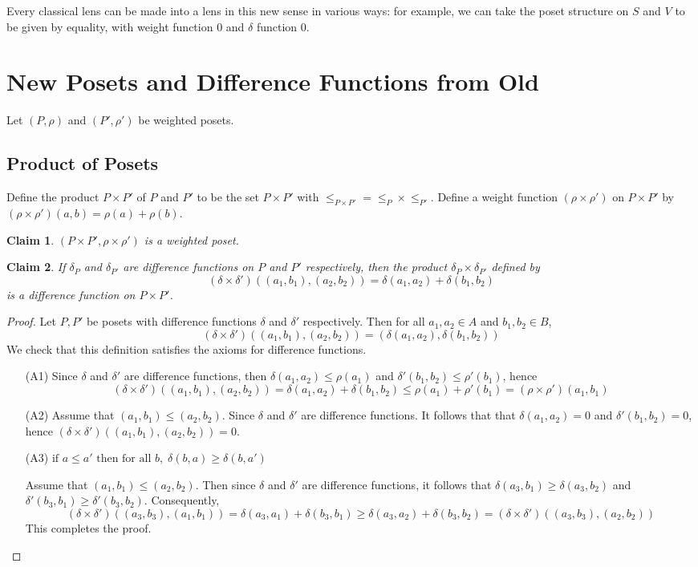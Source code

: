 \documentclass[acmsmall,review,anonymous]{acmart}\settopmatter{printfolios=true,printccs=false,printacmref=false}
\newtheorem{claim}{Claim}
\begin{document}
Every classical lens can be made into a lens in this new sense in various
ways: for example, we can take the poset structure on $S$
and $V$ to be given by equality, with weight function 0 and $\delta$ function 0.

\section{New Posets and Difference Functions from Old}
Let $(P, \rho)$ and $(P', \rho')$ be weighted posets.

\subsection{Product of Posets}
Define the product $P \times P'$ of $P$ and $P'$ to be the set $P \times P'$
with $\leq_{P \times P'} = \leq_P \times \leq_{P'}$. Define a weight function
$(\rho \times \rho')$ on $P \times P'$ by $(\rho \times \rho')(a, b) = \rho(a)
+ \rho(b)$.
\begin{claim}
$(P \times P', \rho \times \rho')$ is a weighted poset.
\end{claim}
\begin{claim}
If $\delta_P$ and $\delta_{P'}$ are difference functions on $P$ and $P'$
respectively, then the product $\delta_P \times \delta_{P'}$ defined by
$$(\delta \times \delta')((a_1, b_1), (a_2, b_2)) = \delta(a_1, a_2) +
\delta(b_1, b_2)$$
is a difference function on $P \times P'$.
\end{claim}
\begin{proof}
Let $P, P'$ be posets with difference functions $\delta$ and $\delta'$
respectively. Then for all $a_1, a_2 \in A$ and $b_1, b_2 \in B$,
$$
(\delta \times \delta')((a_1, b_1), (a_2, b_2)) = (\delta(a_1, a_2),
\delta(b_1, b_2))
$$
We check that this definition satisfies the axioms for difference functions.
\begin{enumerate}
  \item[(A1)]
  Since $\delta$ and $\delta'$ are difference functions, then $\delta(a_1, a_2)
  \leq \rho(a_1)$ and $\delta'(b_1, b_2) \leq \rho'(b_1)$, hence $$
  (\delta \times \delta')((a_1, b_1), (a_2, b_2)) = \delta(a_1, a_2) +
  \delta(b_1, b_2) \leq \rho(a_1) + \rho'(b_1) = (\rho \times
  \rho')(a_1, b_1)$$
  \item[(A2)]
  Assume that $(a_1, b_1) \leq (a_2, b_2)$. Since $\delta$ and
  $\delta'$ are difference functions. It follows that that $\delta(a_1, a_2) =
  0$ and $\delta'(b_1, b_2) = 0$, hence $(\delta \times \delta')((a_1, b_1),
  (a_2, b_2)) = 0$.
  \item[(A3)]
  $\text{if } a \leq a' \text{ then for all }b , \; \delta(b, a) \geq \delta(b,
  a')$
  
  Assume that $(a_1, b_1) \leq (a_2, b_2)$. Then since $\delta$ and $\delta'$ are
  difference functions, it follows that $\delta(a_3, b_1) \geq \delta(a_3, b_2)$
  and $\delta'(b_3, b_1) \geq \delta'(b_3, b_2)$. Consequently,
  $$(\delta \times \delta')((a_3, b_3), (a_1, b_1)) = \delta(a_3, a_1) +
  \delta(b_3, b_1) \geq \delta(a_3, a_2) + \delta(b_3, b_2) = (\delta \times
  \delta')((a_3, b_3), (a_2, b_2))$$
  This completes the proof.
\end{enumerate}
\end{proof}
\end{document}
